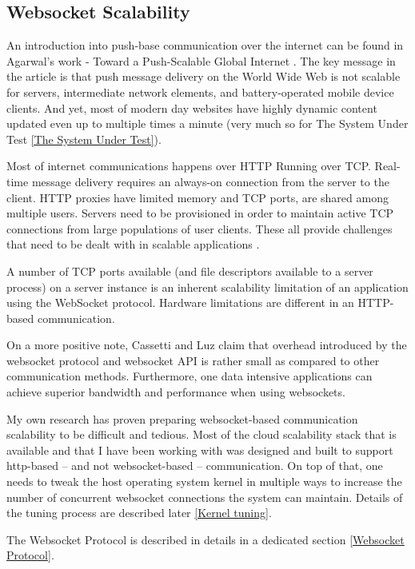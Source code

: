 \documentclass{uvamscse}
\begin{document}
\subsection{Websocket Scalability}\label{Websocket Scalability}

An introduction into push-base communication over the internet can be found in Agarwal’s work - Toward a Push-Scalable Global Internet \cite{PushScale}. The key message in the article is that push message delivery on the World Wide Web is not scalable for servers, intermediate network elements, and battery-operated mobile device clients. And yet, most of modern day websites have highly dynamic content updated even up to multiple times a minute (very much so for The System Under Test \ref{The System Under Test}).

Most of internet communications happens over HTTP Running over TCP. Real-time message delivery requires an always-on connection from the server to the client. HTTP proxies have limited memory and TCP ports, are shared among multiple users. Servers need to be provisioned in order to maintain active TCP connections from large populations of user  clients. These all provide challenges that need to be dealt with in scalable applications \cite{PushScale}.

A number of TCP ports available (and file descriptors available to a server process) on a server instance is an inherent scalability limitation of an application using the WebSocket protocol. Hardware limitations are different in an HTTP-based communication.

On a more positive note, Cassetti and Luz \cite{WebsApi} claim that overhead introduced by the websocket protocol and websocket API is rather small as compared to other communication methods. Furthermore, one data intensive applications can achieve superior bandwidth and performance when using websockets.

My own research has proven preparing websocket-based communication scalability to be difficult and tedious. Most of the cloud scalability stack that is available and that I have been working with was designed and built to support http-based -- and not websocket-based -- communication. On top of that, one needs to tweak the host operating system kernel in multiple ways to increase the number of concurrent websocket connections the system can maintain. Details of the tuning process are described later \ref{Kernel tuning}.

The Websocket Protocol is described in details in a dedicated section \ref{Websocket Protocol}.
\end{document}
